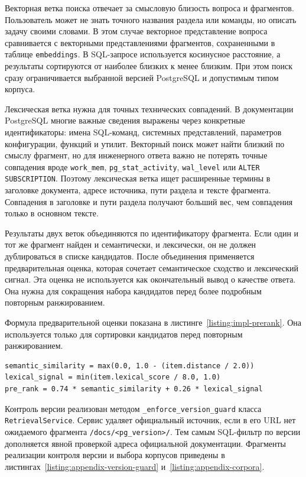 Векторная ветка поиска отвечает за смысловую близость вопроса и фрагментов. Пользователь может не знать точного названия раздела или команды, но описать задачу своими словами. В этом случае векторное представление вопроса сравнивается с векторными представлениями фрагментов, сохраненными в таблице \texttt{embeddings}. В SQL-запросе используется косинусное расстояние, а результаты сортируются от наиболее близких к менее близким. При этом поиск сразу ограничивается выбранной версией PostgreSQL и допустимым типом корпуса.

Лексическая ветка нужна для точных технических совпадений. В документации PostgreSQL многие важные сведения выражены через конкретные идентификаторы: имена SQL-команд, системных представлений, параметров конфигурации, функций и утилит. Векторный поиск может найти близкий по смыслу фрагмент, но для инженерного ответа важно не потерять точные совпадения вроде \texttt{work\_mem}, \texttt{pg\_stat\_activity}, \texttt{wal\_level} или \texttt{ALTER SUBSCRIPTION}. Поэтому лексическая ветка ищет расширенные термины в заголовке документа, адресе источника, пути раздела и тексте фрагмента. Совпадения в заголовке и пути раздела получают больший вес, чем совпадения только в основном тексте.

Результаты двух веток объединяются по идентификатору фрагмента. Если один и тот же фрагмент найден и семантически, и лексически, он не должен дублироваться в списке кандидатов. После объединения применяется предварительная оценка, которая сочетает семантическое сходство и лексический сигнал. Эта оценка не используется как окончательный вывод о качестве ответа. Она нужна для сокращения набора кандидатов перед более подробным повторным ранжированием.

Формула предварительной оценки показана в листинге~\ref{listing:impl-prerank}. Она используется только для сортировки кандидатов перед повторным ранжированием.

\begin{listingblock}
\label{listing:impl-prerank}
\begin{verbatim}
semantic_similarity = max(0.0, 1.0 - (item.distance / 2.0))
lexical_signal = min(item.lexical_score / 8.0, 1.0)
pre_rank = 0.74 * semantic_similarity + 0.26 * lexical_signal
\end{verbatim}
\end{listingblock}

Контроль версии реализован методом \texttt{\_enforce\_version\_guard} класса \texttt{RetrievalService}. Сервис удаляет официальный источник, если в его URL нет ожидаемого фрагмента \texttt{/docs/<pg\_version>/}. Тем самым SQL-фильтр по версии дополняется явной проверкой адреса официальной документации. Фрагменты реализации контроля версии и выбора корпусов приведены в листингах~\ref{listing:appendix-version-guard} и~\ref{listing:appendix-corpora}.

